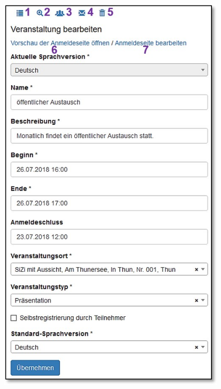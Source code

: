 \begin{figure}   %
  \vspace{-25pt}      %
  \begin{center}
    \includegraphics[width=1\linewidth]{../chapters/10_CRM/pictures/10-2-1_NeueVeranstaltung_erweitert.jpg}
  \end{center}
  \vspace{-20pt}
  \vspace{-10pt}
\end{figure}

